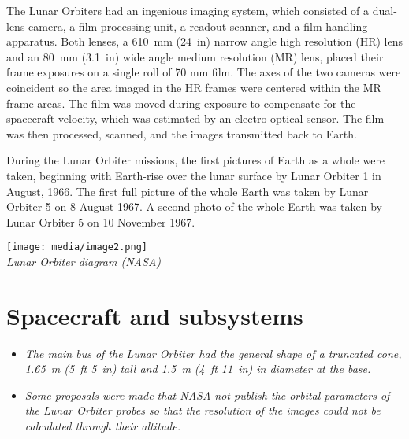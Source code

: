 The Lunar Orbiters had an ingenious imaging system, which consisted of a
dual-lens camera, a film processing unit, a readout scanner, and a film
handling apparatus. Both lenses, a 610~mm (24~in) narrow angle high
resolution (HR) lens and an 80~mm (3.1~in) wide angle medium resolution
(MR) lens, placed their frame exposures on a single roll of 70 mm film.
The axes of the two cameras were coincident so the area imaged in the HR
frames were centered within the MR frame areas. The film was moved
during exposure to compensate for the spacecraft velocity, which was
estimated by an electro-optical sensor. The film was then processed,
scanned, and the images transmitted back to Earth.

During the Lunar Orbiter missions, the first pictures of Earth as a
whole were taken, beginning with Earth-rise over the lunar surface by
Lunar Orbiter 1 in August, 1966. The first full picture of the whole
Earth was taken by Lunar Orbiter 5 on 8 August 1967. A second photo of
the whole Earth was taken by Lunar Orbiter 5 on 10 November 1967.

\texttt{[image: media/image2.png]}\\
\emph{Lunar Orbiter diagram (NASA)}

\section{Spacecraft and subsystems}\label{spacecraft-and-subsystems}

\begin{itemize}
\item
  \emph{The main bus of the Lunar Orbiter had the general shape of a
  truncated cone, 1.65~m (5~ft 5~in) tall and 1.5~m (4~ft 11~in) in
  diameter at the base.}
\item
  \emph{Some proposals were made that NASA not publish the orbital
  parameters of the Lunar Orbiter probes so that the resolution of the
  images could not be calculated through their altitude.}
\end{itemize}

